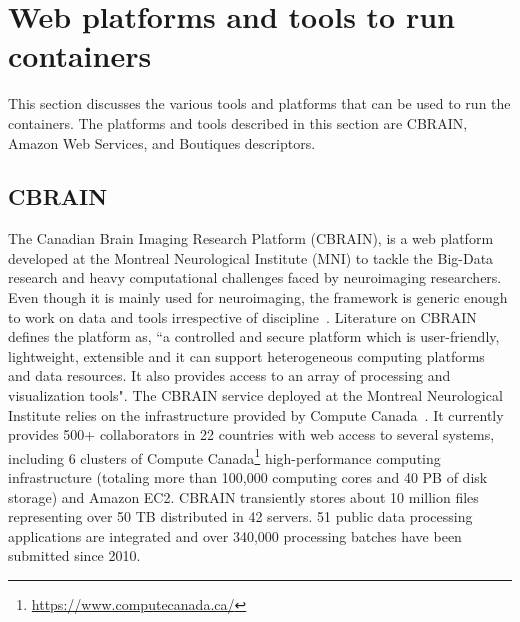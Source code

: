 \section{Web platforms and tools to run containers}\label{web_platforms}
This section discusses the various tools and platforms that can be used to run the containers. The platforms and tools described in this section are CBRAIN, Amazon Web Services, and Boutiques descriptors.
\subsection{CBRAIN}
The Canadian Brain Imaging Research Platform (CBRAIN), is a web 
platform developed at the Montreal Neurological Institute (MNI) to 
tackle the Big-Data research and heavy computational challenges faced 
by neuroimaging researchers. Even though it is mainly used for 
neuroimaging, the framework is generic enough to work on data and 
tools irrespective of discipline~\cite{DBLP:journals/fini/DasGRSPMSRSKMKR17}. Literature on
CBRAIN~\cite{DBLP:journals/fini/DasGRSPMSRSKMKR17} defines the platform 
as, ``a controlled and secure platform which is user-friendly, 
lightweight, extensible and it can support heterogeneous computing 
platforms and data resources. It also provides access to an array of 
processing and visualization tools". The CBRAIN service deployed at the 
Montreal Neurological Institute relies on the infrastructure provided 
by Compute Canada~\cite{DAS20161188}. It currently provides 500+ 
collaborators in 22 countries with web access to several systems, 
including 6 clusters of Compute Canada\footnote{\url{https://www.computecanada.ca/}} high-performance
computing infrastructure (totaling more than 100,000 computing cores 
and 40 PB of disk storage) and Amazon EC2. CBRAIN transiently stores 
about 10 million files representing over 50 TB distributed in 42 
servers. 51 public data processing applications are integrated and over 
340,000 processing batches have been submitted since 2010.

